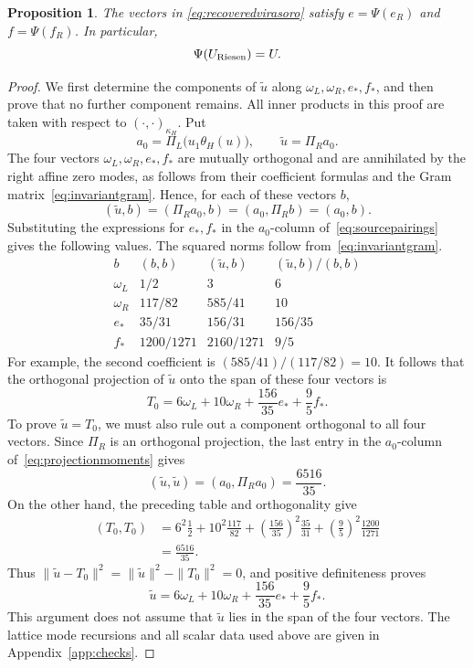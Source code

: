 \documentclass[11pt,reqno]{amsart}
\newtheorem{proposition}[theorem]{Proposition}
\theoremstyle{definition}\newtheorem{definition}[theorem]{Definition}
\theoremstyle{remark}\newtheorem{remark}[theorem]{Remark}
\numberwithin{equation}{section}
\begin{document}
\begin{proposition}\label{prop:RiesenEquality}
The vectors in \eqref{eq:recoveredvirasoro} satisfy $e=\Psi(e_R)$ and $f=\Psi(f_R)$. In particular,
\[
 \Psi(U_{\rm Riesen})=U.
\]
\end{proposition}
\begin{proof}
We first determine the components of $\widetilde u$ along $\omega_L,\omega_R,e_*,f_*$, and then prove that no further component remains. All inner products in this proof are taken with respect to $(\cdot,\cdot)_{\kappa_H}$. Put
\[
 a_0=\Pi_L\bigl(u_1\theta_H(u)\bigr),\qquad
 \widetilde u=\Pi_Ra_0.
\]
The four vectors $\omega_L,\omega_R,e_*,f_*$ are mutually orthogonal and are annihilated by the right affine zero modes, as follows from their coefficient formulas and the Gram matrix~\eqref{eq:invariantgram}. Hence, for each of these vectors $b$,
\[
 (\widetilde u,b)=(\Pi_Ra_0,b)=(a_0,\Pi_Rb)=(a_0,b).
\]
Substituting the expressions for $e_*,f_*$ in the $a_0$-column of~\eqref{eq:sourcepairings} gives the following values. The squared norms follow from~\eqref{eq:invariantgram}.
\[
\begin{array}{c|ccc}
 b&(b,b)&(\widetilde u,b)&(\widetilde u,b)/(b,b)\\\hline
 \omega_L&1/2&3&6\\
 \omega_R&117/82&585/41&10\\
 e_*&35/31&156/31&156/35\\
 f_*&1200/1271&2160/1271&9/5
\end{array}
\]
For example, the second coefficient is $(585/41)/(117/82)=10$. It follows that the orthogonal projection of $\widetilde u$ onto the span of these four vectors is
\[
 T_0=6\omega_L+10\omega_R+\frac{156}{35}e_*+\frac95f_*.
\]
To prove $\widetilde u=T_0$, we must also rule out a component orthogonal to all four vectors. Since $\Pi_R$ is an orthogonal projection, the last entry in the $a_0$-column of~\eqref{eq:projectionmoments} gives
\[
 (\widetilde u,\widetilde u)=(a_0,\Pi_Ra_0)=\frac{6516}{35}.
\]
On the other hand, the preceding table and orthogonality give
\[
 \begin{aligned}
 (T_0,T_0)
 &=6^2\frac12+10^2\frac{117}{82}
   +\left(\frac{156}{35}\right)^2\frac{35}{31}
   +\left(\frac95\right)^2\frac{1200}{1271}\\
 &=\frac{6516}{35}.
 \end{aligned}
\]
Thus $\|\widetilde u-T_0\|^2=\|\widetilde u\|^2-\|T_0\|^2=0$, and positive definiteness proves
\[
 \widetilde u=6\omega_L+10\omega_R+\frac{156}{35}e_*+\frac95f_*.
\]
This argument does not assume that $\widetilde u$ lies in the span of the four vectors. The lattice mode recursions and all scalar data used above are given in Appendix~\ref{app:checks}.


\end{proof}
\end{document}
